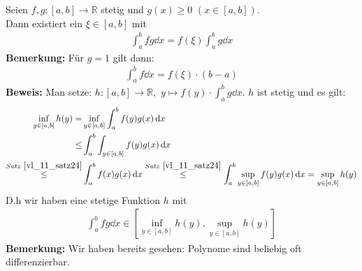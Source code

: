 \begin{Satz}{
	Seien $f,g: [a,b] \rightarrow \mathbb{R}$ stetig und 
	$g(x) \geq 0$ $(x \in[a,b])$. \\
	Dann existiert ein $\xi \in [a,b]$ mit 
	\begin{align*}
		\int_a^b f g \dd{x} = f(\xi) \int_a^b g\dd{x}
	\end{align*}
	\textbf{Bemerkung:}
	Für $g = 1$ gilt dann: 
	\begin{align*}
		\int_a^b f \dd{x} = f(\xi) \cdot (b-a)
	\end{align*}
	\textbf{Beweis:} Man setze: $h: [a,b] \rightarrow \mathbb{R},$ $y \mapsto f(y) 
	\cdot \int_a^b g \dd{x}$. $h$ ist stetig und es gilt:
	\begin{align*}
		\inf_{y \in [a,b]} h(y) = & \inf_{y \in [a,b]} \int_a^b f(y) g(x) \dd{x} \\
		\leq & \int_a^b \int_{y \in [a,b]} f(y) g(x) \dd{x} \\
		 \overset{Satz~\ref{vl_11_satz24}}{\le} & \int_a^bf(x)g(x) \dd{x} 
		\overset{Satz~\ref{vl_11_satz24}}{\le}
		\int_a^b \sup_{y \in [a,b]} f(y) g(x) \dd{x} = \sup_{y \in [a,b]} h(y)
	\end{align*}
	D.h wir haben eine stetige Funktion $h$ mit 
	\begin{align*}
		\int_a^b fg\dd{x} \in [\inf_{y \in [a,b]} h(y),  \sup_{y \in [a,b]} h(y)]
	\end{align*}
	\textbf{Bemerkung:} Wir haben bereits gesehen: Polynome sind beliebig oft
	 differenzierbar.
	
}\end{Satz}